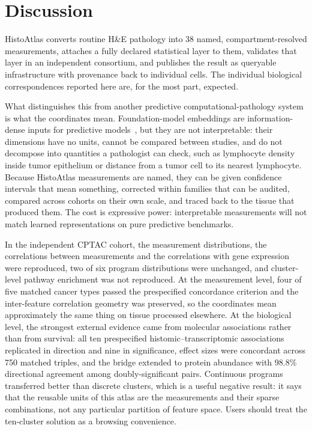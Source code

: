 \section{Discussion}
\label{sec:discussion}

HistoAtlas converts
routine H\&E pathology into 38 named, compartment-resolved measurements, attaches
a fully declared statistical layer to them, validates that layer in an
independent consortium, and publishes the result as queryable infrastructure with
provenance back to individual cells. The individual biological correspondences
reported here are, for the most part, expected.

What distinguishes this from another predictive computational-pathology system is
what the coordinates mean. Foundation-model embeddings are information-dense inputs for predictive
models~\cite{chen2024uni, vorontsov2024virchow}, but they are not interpretable:
their dimensions have no units,
cannot be compared between studies, and do not decompose into quantities a
pathologist can check, such as lymphocyte density inside tumor epithelium or
distance from a tumor cell to its nearest lymphocyte. Because HistoAtlas
measurements are named, they can be given confidence intervals that mean
something, corrected within families that can be audited, compared across
cohorts on their own scale, and traced back to the tissue that produced them. The cost is expressive
power: interpretable measurements will not match learned representations on pure
predictive benchmarks.

In the independent CPTAC cohort, the measurement distributions, the
correlations between measurements and the correlations with gene expression
were reproduced, two of six program distributions were unchanged, and
cluster-level pathway enrichment was not reproduced. At the measurement level, four of five matched cancer types passed the
prespecified concordance criterion and the inter-feature correlation geometry
was preserved, so the coordinates mean approximately the same thing on tissue
processed elsewhere. At the biological level, the strongest external evidence
came from molecular associations rather than from survival: all ten prespecified
histomic--transcriptomic associations replicated in direction and nine in
significance, effect sizes were concordant across 750 matched triples, and the
bridge extended to protein abundance with 98.8\% directional agreement among
doubly-significant pairs. Continuous programs transferred better than discrete
clusters, which is a useful negative result: it says that the reusable units of
this atlas are the measurements and their sparse combinations, not any
particular partition of feature space. Users should treat the ten-cluster
solution as a browsing convenience.

